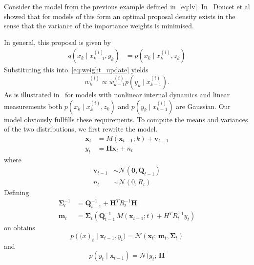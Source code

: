 \begin{example}\label{ex:lv2}
  Consider the model from the previous example defined
  in~\eqref{eq:lv}. In~\cite{Doucet2000} Doucet et al showed that for
  models of this form an optimal proposal density exists in the sense
  that the variance of the importance weights is minimised.

  In general, this proposal is given by
  \begin{align*}
    q(x_k \mid x^{(i)}_{k-1}, y_k) &= p(x_k \mid x_k^{(i)}, z_k)
  \end{align*}
  Substituting this into~\eqref{eq:weight_update} yields
  \[
    w_k^{(i)} \propto w_{k-1}^{(i)} p(y_k \mid x_{k-1}^{(i)}).
  \]
  As is illustrated in~\cite[Example 3]{Doucet2000} for models with
  nonlinear internal dynamics and linear measurements both
  $p(x_k \mid x_k^{(i)}, z_k)$ and $p(y_k \mid x_{k-1}^{(i)})$ are
  Gaussian. Our model obviously fullfills these requirements. To
  compute the means and variances of the two distributions, we first
  rewrite the model.
  \begin{equation}
    \label{eq:new_model}
    \begin{aligned}
      \bm{x}_t &= M(\bm{x}_{t-1};k) + \bm{v}_{t-1} \\
      y_t &= \bm{H} \bm{x}_t + n_t
    \end{aligned}
  \end{equation}
  where
  \begin{equation*}
    \begin{aligned}
      \bm{v}_{t-1} &\sim \mathcal{N}(\bm{0}, \bm{Q}_{t-1}) \\
      n_t &\sim \mathcal{N}(0, R_t)
    \end{aligned}
  \end{equation*}
  Defining
  \begin{align*}
    \bm{\Sigma}_t^{-1} &= \bm{Q}_{t-1}^{-1} + \bm{H}^T R_t^{-1} \bm{H}\\
    \bm{m}_t &= \bm{\Sigma}_t (\bm{Q}_{t-1}^{-1}\, M(\bm{x}_{t-1}; t) + H^T R_t^{-1} y_t)
  \end{align*}
  on obtains
  \begin{equation}
    \label{eq:optimal_proposal}
    p(\bm(x)_t \mid \bm{x}_{t-1}, y_t) = \mathcal{N}(\bm{x}_t;\,
    \bm{m}_t, \bm{\Sigma}_t)
  \end{equation}
  and
  \begin{equation}
    \label{eq:optimal_weight}
    p(y_t \mid \bm{x}_{t-1}) = \mathcal{N}(y_t; \, \bm{H}

\end{equation}
\end{example}
